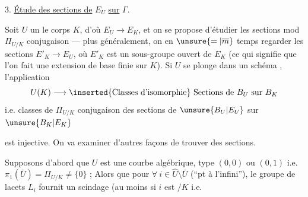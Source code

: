 3. \uline{Étude des sections de} $E_U$ \uline{sur} $\Gamma$.

Soit $U$ un   le corps $K$, d'où $E_U\longrightarrow E_K$, et on se propose d'étudier les sections mod $\Pi_{U/K}$ conjugaison --- plus généralement, on  en $\unsure{=|\overline m}$ temps regarder les sections $E'_K\longrightarrow E_U$, où $E'_K$ est un sous-groupe ouvert de $E_K$ (ce qui signifie que l'on fait une extension de base finie sur $K$). Si  $U$ se plonge dans un schéma  , l'application
\[
U(K)\longrightarrow \inserted{\text{Classes d'isomorphie}}\ \text{Sections de }B_U\text{ sur }B_K
\]
i.e. classes de $\Pi_{U/K}$ conjugaison des sections de $\unsure{B_U|E_U}$ sur $\unsure{B_K|E_K}$

est injective. On va examiner d'autres façons  de trouver des sections.

Supposons d'abord que $U$ est une courbe algébrique,   type $(0,0)$ ou $(0,1)$ i.e. $\pi_1(\bar U)=\Pi_{U/K}\ne\{0\}$ ; Alors  que pour $\forall\ i\in\widehat U\setminus\bar U$ (``pt à l'infini''), le groupe de lacets $L_i$ fournit un scindage (au moins si $i$ est $/K$ i.e. 

